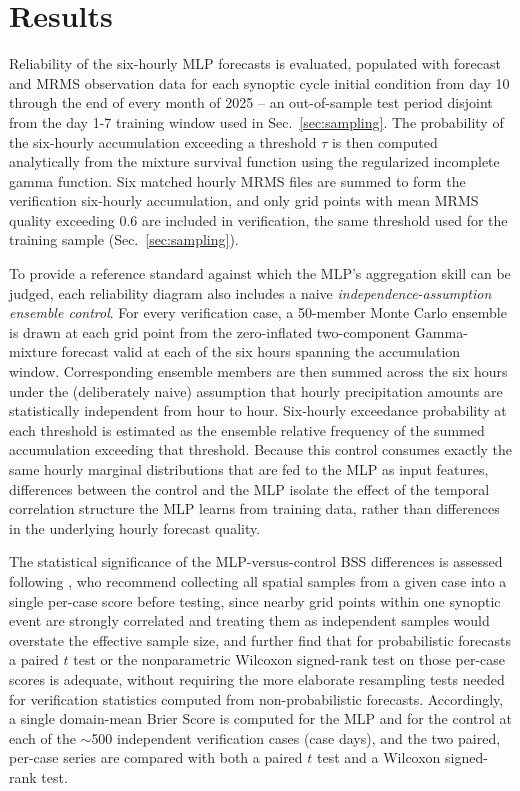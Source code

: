 \documentclass[11pt]{article}
\begin{document}
\section{Results}
\label{sec:results}

Reliability of the six-hourly MLP forecasts is evaluated, populated with forecast
and MRMS observation data for each synoptic cycle initial condition from day 10
through the end of every month of 2025 -- an out-of-sample test period disjoint
from the day 1-7 training window used in Sec.~\ref{sec:sampling}.
The probability of the six-hourly accumulation exceeding a threshold
$\tau$ is then computed analytically from the mixture survival function using
the regularized incomplete gamma function.  Six matched hourly MRMS files
are summed to form the verification six-hourly accumulation, and only grid
points with mean MRMS quality exceeding 0.6 are included in verification,
the same threshold used for the training sample (Sec.~\ref{sec:sampling}).

To provide a reference standard against which the MLP's aggregation skill
can be judged, each reliability diagram also includes a naive
\emph{independence-assumption ensemble control}.  For every verification
case, a 50-member Monte Carlo ensemble is drawn at each grid point from the
zero-inflated two-component Gamma-mixture forecast valid at each of the six
hours spanning the accumulation window.  Corresponding ensemble members are
then summed across the six hours under the (deliberately naive) assumption
that hourly precipitation amounts are statistically independent from hour to
hour.  Six-hourly exceedance probability at each threshold is estimated as
the ensemble relative frequency of the summed accumulation exceeding that
threshold.  Because this control consumes exactly the same hourly marginal
distributions that are fed to the MLP as input features, differences between
the control and the MLP isolate the effect of the temporal correlation
structure the MLP learns from training data, rather than differences in the
underlying hourly forecast quality.

The statistical significance of the MLP-versus-control BSS differences is
assessed following \citet{hamill1999}, who recommend collecting all
spatial samples from a given case into a single per-case score before
testing, since nearby grid points within one synoptic event are strongly
correlated and treating them as independent samples would overstate the
effective sample size, and further find that for probabilistic forecasts a
paired $t$ test or the nonparametric Wilcoxon signed-rank test on those
per-case scores is adequate, without requiring the more elaborate
resampling tests needed for verification statistics computed from
non-probabilistic forecasts.  Accordingly, a single domain-mean Brier Score
is computed for the MLP and for the control at each of the $\sim$500
independent verification cases (case days), and the two paired,
per-case series are compared with both a paired $t$ test and a Wilcoxon
signed-rank test.
\end{document}
